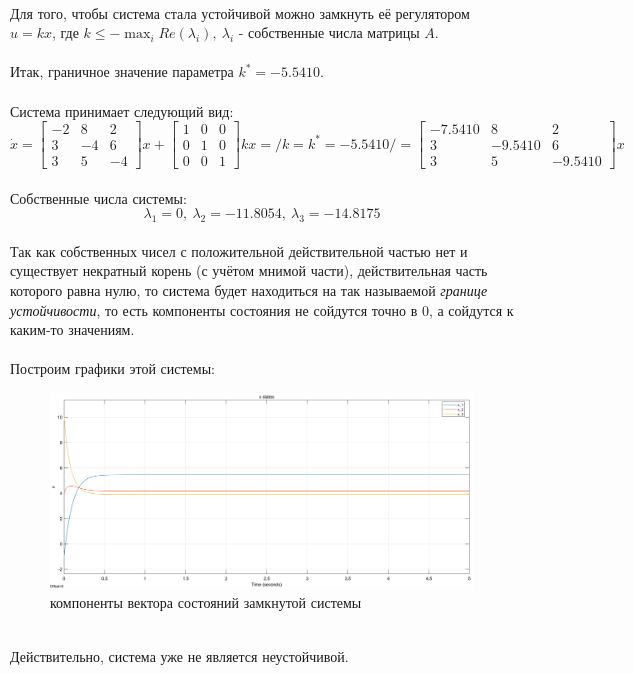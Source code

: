 \documentclass[12pt]{article}
\begin{document}
\ \\
Для того, чтобы система стала устойчивой можно замкнуть её регулятором $u = kx$, где $k \leq -\max_i{Re(\lambda_i)}, \ \lambda_i$ - собственные числа матрицы $A$.\\
\ \\
Итак, граничное значение параметра $k^* = -5.5410$. \\
\ \\
Система принимает следующий вид:
\[
\dot{x}=\begin{bmatrix}
-2 & 8 & 2\\
3 & -4 & 6\\
3 & 5 & -4
\end{bmatrix}x+\begin{bmatrix}
1 & 0 & 0\\
0 & 1 & 0\\
0 & 0 & 1
\end{bmatrix}kx = /k=k^*=-5.5410/ = 
\begin{bmatrix}
-7.5410 & 8 & 2\\
3 & -9.5410 & 6\\
3 & 5 & -9.5410
\end{bmatrix}x
\]\\
Собственные числа системы:
\[
\lambda_1 = 0,\ \lambda_2 = -11.8054,\ \lambda_3 = -14.8175
\]\\
Так как собственных чисел с положительной действительной частью нет и существует некратный корень (с учётом мнимой части), действительная часть которого равна нулю, то система будет находиться на так называемой \emph{границе устойчивости}, то есть компоненты состояния не сойдутся точно в 0, а сойдутся к каким-то значениям.\\
\ \\
Построим графики этой системы:
\ \\
\begin{figure}[h]
    \centering
    \includegraphics[width=\textwidth]{x_reg_states}
    \caption{компоненты вектора состояний замкнутой системы}
    \label{fig:x_states}
\end{figure} \\
Действительно, система уже не является неустойчивой.
\end{document}
